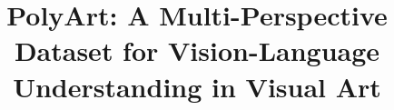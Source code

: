 \documentclass[sigconf,review,anonymous]{acmart}
\begin{document}
\title{PolyArt: A Multi-Perspective Dataset for Vision-Language Understanding in Visual Art}

%




\renewcommand{\shortauthors}{Shuai Wang et al.}


\end{document}
